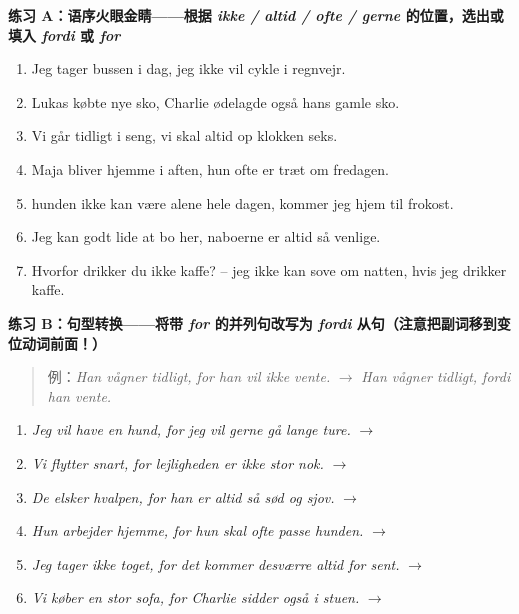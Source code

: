 
\textbf{练习 A：语序火眼金睛——根据 \textit{ikke / altid / ofte / gerne} 的位置，选出或填入 \textit{fordi} 或 \textit{for}}
\begin{enumerate}
  \item Jeg tager bussen i dag, \underline{\hspace{1.8cm}} jeg ikke vil cykle i regnvejr.
  \item Lukas købte nye sko, \underline{\hspace{1.8cm}} Charlie ødelagde også hans gamle sko.
  \item Vi går tidligt i seng, \underline{\hspace{1.8cm}} vi skal altid op klokken seks.
  \item Maja bliver hjemme i aften, \underline{\hspace{1.8cm}} hun ofte er træt om fredagen.
  \item \underline{\hspace{1.8cm}} hunden ikke kan være alene hele dagen, kommer jeg hjem til frokost.
  \item Jeg kan godt lide at bo her, \underline{\hspace{1.8cm}} naboerne er altid så venlige.
  \item Hvorfor drikker du ikke kaffe? -- \underline{\hspace{1.8cm}} jeg ikke kan sove om natten, hvis jeg drikker kaffe.
\end{enumerate}

\textbf{练习 B：句型转换——将带 \textit{for} 的并列句改写为 \textit{fordi} 从句（注意把副词移到变位动词前面！）}
\begin{quote}
\small 例：\textit{Han vågner tidligt, for han vil ikke vente.} $\rightarrow$ \textit{Han vågner tidligt, fordi han  vente.}
\end{quote}
\begin{enumerate}
  \item \textit{Jeg vil have en hund, for jeg vil gerne gå lange ture.} $\rightarrow$
  \item \textit{Vi flytter snart, for lejligheden er ikke stor nok.} $\rightarrow$
  \item \textit{De elsker hvalpen, for han er altid så sød og sjov.} $\rightarrow$
  \item \textit{Hun arbejder hjemme, for hun skal ofte passe hunden.} $\rightarrow$
  \item \textit{Jeg tager ikke toget, for det kommer desværre altid for sent.} $\rightarrow$
  \item \textit{Vi køber en stor sofa, for Charlie sidder også i stuen.} $\rightarrow$
\end{enumerate}

